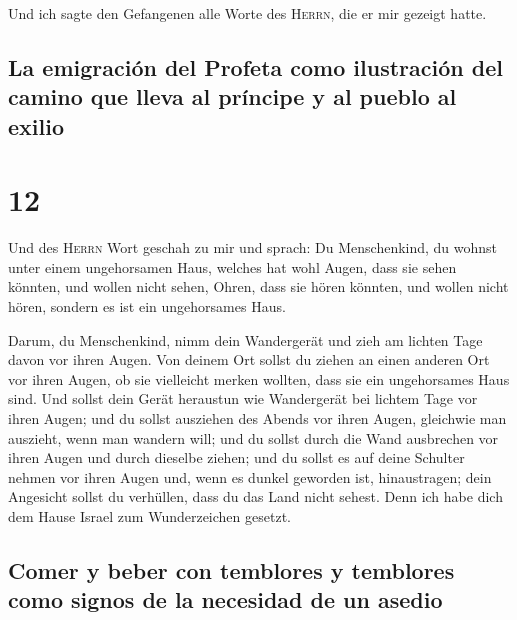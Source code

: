 Und ich sagte den Gefangenen alle Worte des
\textsc{Herrn}, die er mir gezeigt hatte.

\hypertarget{la-emigraciuxf3n-del-profeta-como-ilustraciuxf3n-del-camino-que-lleva-al-pruxedncipe-y-al-pueblo-al-exilio}{%
\subsection{La emigración del Profeta como ilustración del camino que
lleva al príncipe y al pueblo al
exilio}\label{la-emigraciuxf3n-del-profeta-como-ilustraciuxf3n-del-camino-que-lleva-al-pruxedncipe-y-al-pueblo-al-exilio}}

\hypertarget{section-11}{%
\section{12}\label{section-11}}

 Und des \textsc{Herrn} Wort geschah zu mir und sprach:
 Du Menschenkind, du wohnst unter einem ungehorsamen Haus,
welches hat wohl Augen, dass sie sehen könnten, und wollen nicht sehen,
Ohren, dass sie hören könnten, und wollen nicht hören, sondern es ist
ein ungehorsames Haus.

 Darum, du Menschenkind, nimm dein Wandergerät und zieh am
lichten Tage davon vor ihren Augen. Von deinem Ort sollst du ziehen an
einen anderen Ort vor ihren Augen, ob sie vielleicht merken wollten,
dass sie ein ungehorsames Haus sind.  Und sollst dein
Gerät heraustun wie Wandergerät bei lichtem Tage vor ihren Augen; und du
sollst ausziehen des Abends vor ihren Augen, gleichwie man auszieht,
wenn man wandern will;  und du sollst durch die Wand
ausbrechen vor ihren Augen und durch dieselbe ziehen;  und
du sollst es auf deine Schulter nehmen vor ihren Augen und, wenn es
dunkel geworden ist, hinaustragen; dein Angesicht sollst du verhüllen,
dass du das Land nicht sehest. Denn ich habe dich dem Hause Israel zum
Wunderzeichen gesetzt.

\hypertarget{comer-y-beber-con-temblores-y-temblores-como-signos-de-la-necesidad-de-un-asedio}{%
\subsection{Comer y beber con temblores y temblores como signos de la
necesidad de un
asedio}\label{comer-y-beber-con-temblores-y-temblores-como-signos-de-la-necesidad-de-un-asedio}}

